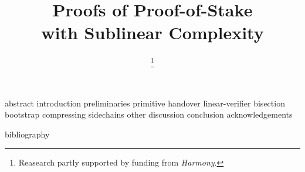 \documentclass[conference]{IEEEtran}
\begin{document}
\title{\🍑 Proofs of Proof-of-Stake\\with Sublinear Complexity}

\ifanonymous\else
\author{\thanks{Reasearch partly supported by funding from \emph{Harmony}.}
}
\fi

\IEEEoverridecommandlockouts
\makeatletter{}\makeatother
{}

\maketitle

{abstract}
{introduction}
{preliminaries}
{primitive}
{handover}
{linear-verifier}
{bisection}
{bootstrap}
{compressing}
{sidechains}
{other}
{discussion}
{conclusion}
\ifanonymous\else
{acknowledgements}
\fi

{bibliography}
\end{document}
